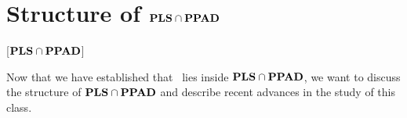 \section{Structure of \texorpdfstring{$\textbf{PLS} \cap \textbf{PPAD}$}{\PLS\ and \PPAD}}[\texorpdfstring{$\textbf{PLS} \cap \textbf{PPAD}$}{\PLS\ and \PPAD}]

Now that we have established that \Tarski\ lies inside $\textbf{PLS} \cap \textbf{PPAD}$, we want to discuss the structure of $\textbf{PLS} \cap \textbf{PPAD}$ and describe recent advances in
the study of this class.